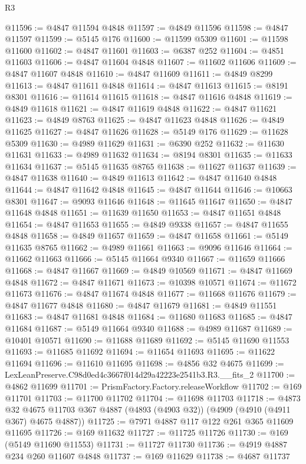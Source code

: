\begin{lexlean}{R3}
\begin{coremodule}
@11596 := @4847 @11594 @4848
@11597 := @4849 @11596
@11598 := @4847 @11597
@11599 := @5145 @176
@11600 := @11599 @5309
@11601 := @11598 @11600
@11602 := @4847 @11601
@11603 := @6387 @252
@11604 := @4851 @11603
@11606 := @4847 @11604 @4848
@11607 := @11602 @11606
@11609 := @4847 @11607 @4848
@11610 := @4847 @11609
@11611 := @4849 @8299
@11613 := @4847 @11611 @4848
@11614 := @4847 @11613
@11615 := @8191 @8301
@11616 := @11614 @11615
@11618 := @4847 @11616 @4848
@11619 := @4849 @11618
@11621 := @4847 @11619 @4848
@11622 := @4847 @11621
@11623 := @4849 @8763
@11625 := @4847 @11623 @4848
@11626 := @4849 @11625
@11627 := @4847 @11626
@11628 := @5149 @176
@11629 := @11628 @5309
@11630 := @4989 @11629
@11631 := @6390 @252
@11632 := @11630 @11631
@11633 := @4989 @11632
@11634 := @8194 @8301
@11635 := @11633 @11634
@11637 := @5145 @11635 @8765
@11638 := @11627 @11637
@11639 := @4847 @11638
@11640 := @4849 @11613
@11642 := @4847 @11640 @4848
@11644 := @4847 @11642 @4848
@11645 := @4847 @11644
@11646 := @10663 @8301
@11647 := @9093 @11646
@11648 := @11645 @11647
@11650 := @4847 @11648 @4848
@11651 := @11639 @11650
@11653 := @4847 @11651 @4848
@11654 := @4847 @11653
@11655 := @4849 @9338
@11657 := @4847 @11655 @4848
@11658 := @4849 @11657
@11659 := @4847 @11658
@11661 := @5149 @11635 @8765
@11662 := @4989 @11661
@11663 := @9096 @11646
@11664 := @11662 @11663
@11666 := @5145 @11664 @9340
@11667 := @11659 @11666
@11668 := @4847 @11667
@11669 := @4849 @10569
@11671 := @4847 @11669 @4848
@11672 := @4847 @11671
@11673 := @10398 @10571
@11674 := @11672 @11673
@11676 := @4847 @11674 @4848
@11677 := @11668 @11676
@11679 := @4847 @11677 @4848
@11680 := @4847 @11679
@11681 := @4849 @11551
@11683 := @4847 @11681 @4848
@11684 := @11680 @11683
@11685 := @4847 @11684
@11687 := @5149 @11664 @9340
@11688 := @4989 @11687
@11689 := @10401 @10571
@11690 := @11688 @11689
@11692 := @5145 @11690 @11553
@11693 := @11685 @11692
@11694 := @11654 @11693
@11695 := @11622 @11694
@11696 := @11610 @11695
@11698 := @4856 @32 @4675
@11699 := LexLeanPreserve.C98d0ed4c3667f014d29a42223e2541b3.R3.__fits_2
@11700 := @4862 @11699
@11701 := PrismFactory.Factory.releaseWorkflow
@11702 := @169 @11701
@11703 := @11700 @11702
@11704 := @11698 @11703
@11718 := @4873
    @32
    @4675
    @11703
    @367
    @4887
    (@4893 (@4903 @32))
    (@4909 (@4910 (@4911 @367) @4675 @4887))
@11725 := @7971 @4887 @117 @122 @261 @365 @11609 @11695
@11726 := @169 @11632
@11727 := @11725 @11726
@11730 := @169 (@5149 @11690 @11553)
@11731 := @11727 @11730
@11736 := @4919 @4887 @234 @260 @11607 @4848
@11737 := @169 @11629
@11738 := @4687 @11737

\end{coremodule}
\end{lexlean}
